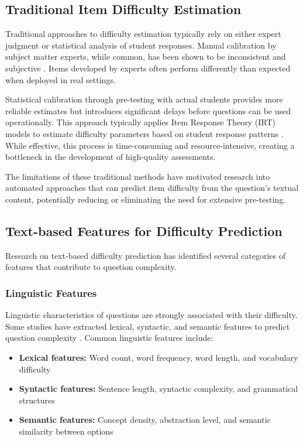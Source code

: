 \documentclass[
    a4paper, %
    10pt, %
    twoside, %
]{LTJournalArticle}
\begin{document}
\subsection{Traditional Item Difficulty Estimation}

Traditional approaches to difficulty estimation typically rely on either expert judgment or statistical analysis of student responses. Manual calibration by subject matter experts, while common, has been shown to be inconsistent and subjective \cite{rudner2010implementing, impara1998teachers}. Items developed by experts often perform differently than expected when deployed in real settings.

Statistical calibration through pre-testing with actual students provides more reliable estimates but introduces significant delays before questions can be used operationally. This approach typically applies Item Response Theory (IRT) models to estimate difficulty parameters based on student response patterns \cite{rasch1960}. While effective, this process is time-consuming and resource-intensive, creating a bottleneck in the development of high-quality assessments.

The limitations of these traditional methods have motivated research into automated approaches that can predict item difficulty from the question's textual content, potentially reducing or eliminating the need for extensive pre-testing.

\subsection{Text-based Features for Difficulty Prediction}

Research on text-based difficulty prediction has identified several categories of features that contribute to question complexity.

\subsubsection{Linguistic Features}

Linguistic characteristics of questions are strongly associated with their difficulty. Some studies have extracted lexical, syntactic, and semantic features to predict question complexity \cite{alkhuzaey2023text, choi2020predicting}. Common linguistic features include:

\begin{itemize}
    \item \textbf{Lexical features:} Word count, word frequency, word length, and vocabulary difficulty \cite{yaneva2019predicting, benedetto2020framework}
    \item \textbf{Syntactic features:} Sentence length, syntactic complexity, and grammatical structures \cite{choi2020predicting}
    \item \textbf{Semantic features:} Concept density, abstraction level, and semantic similarity between options \cite{bulut2023evaluating}
\end{itemize}
\end{document}
